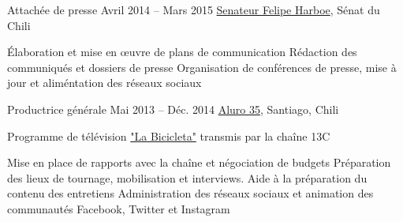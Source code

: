 \begin{joblist}
{		%
	}



\item[Attachée de presse]{Avril 2014 -- Mars 2015}
     { \href{https://www.harboe.cl/}{Senateur Felipe Harboe}, Sénat du Chili } 
	 {
                
		\iftbftiny \vspace{-0.5cm} \fi
			\begin{itemize}
			  \iftbftiny \setlength\itemsep{-3pt} \fi
			  \cvitem[\checkmark] Élaboration et mise en œuvre de plans de communication
			  \cvitem[\checkmark] Rédaction des communiqués et dossiers de presse
			  \cvitem[\checkmark] Organisation de conférences de presse, mise à jour et aliméntation des réseaux sociaux
			\end{itemize}     
			
	}
    
    
    
\item[Productrice générale]{Mai 2013 -- Déc. 2014}
     {\href{https://www.aluro35.com/}  {Aluro 35}, Santiago, Chili}
     {Programme de télévision \href{http://www.13.cl/c/programas/la-bicicleta}{"La Bicicleta"} transmis par la chaîne 13C \\
			
		\iftbftiny \vspace{-0.5cm} \fi
			\begin{itemize}
			  \iftbftiny \setlength\itemsep{-3pt} \fi
			  \cvitem[\checkmark] Mise en place de rapports avec la chaîne et négociation de budgets                       
			  \cvitem[\checkmark] Préparation des lieux de tournage, mobilisation et interviews. Aide à la préparation du contenu des entretiens 
			  \cvitem[\checkmark] Administration des réseaux sociaux et animation des communautés Facebook, Twitter et Instagram                
			\end{itemize}     
			
}
\end{joblist}
